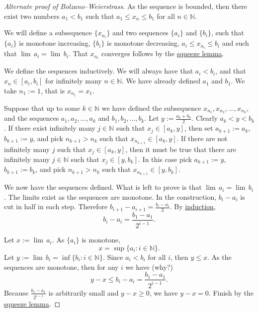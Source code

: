 \documentclass[12pt]{book}
\newcommand{\N}{{\mathbb{N}}}
\theoremstyle{plain}
\theoremstyle{remark}
\theoremstyle{definition}
\theoremstyle{exercise}
\theoremstyle{example}
\begin{document}
\begin{proof}[Alternate proof of Bolzano--Weierstrass]
As the sequence is bounded, then there exist two numbers $a_1 < b_1$
such that $a_1 \leq x_n \leq b_1$ for all $n \in \N$.

We will define a subsequence $\{ x_{n_i} \}$ and two
sequences $\{ a_i \}$ and $\{ b_i \}$, such that
$\{ a_i \}$ is monotone increasing, $\{ b_i \}$ is monotone decreasing,
$a_i \leq x_{n_i} \leq b_i$ and such that $\lim\, a_i = \lim\, b_i$.   That
$x_{n_i}$ converges follows by the \hyperref[squeeze:lemma]{squeeze lemma}.

We define the sequences inductively.  We will always have that $a_i < b_i$,
and that $x_n \in [a_i,b_i]$ for infinitely many
$n \in \N$.
We have already defined $a_1$ and $b_1$.  We take $n_1 := 1$, that is
$x_{n_1} = x_1$.

Suppose that up to some $k \in \N$
we have defined the subsequence $x_{n_1}, x_{n_2}, \ldots,
x_{n_k}$, and the sequences $a_1,a_2,\ldots,a_k$
and $b_1,b_2,\ldots,b_k$.
Let $y := \frac{a_k+b_k}{2}$.
Clearly
$a_k < y < b_k$.  If there exist infinitely many $j \in \N$
such that $x_j \in [a_k,y]$, then set $a_{k+1} := a_k$, $b_{k+1} := y$,
and pick $n_{k+1} > n_{k}$
such that $x_{n_{k+1}} \in [a_k,y]$.  If there are not infinitely many 
$j$ such that 
$x_j \in [a_k,y]$, then it must be true that there are infinitely many $j \in
\N$ such that 
$x_j \in [y,b_k]$.  In this case pick $a_{k+1} := y$, $b_{k+1} := b_k$,
and pick $n_{k+1} > n_{k}$
such that $x_{n_{k+1}} \in [y,b_k]$.

We now have the sequences defined.  What is left to prove is that
$\lim\, a_i = \lim\, b_i$.  The limits exist as the sequences
are monotone.  In the construction,
$b_i - a_i$ is cut in half in each step.  Therefore
$b_{i+1} - a_{i+1} = \frac{b_i-a_i}{2}$.  By
\hyperref[induction:thm]{induction},
\begin{equation*}
b_i - a_i = \frac{b_1-a_1}{2^{i-1}} .
\end{equation*}

Let $x := \lim\, a_i$.  As $\{ a_i \}$ is monotone,
\begin{equation*}
x = \sup \{ a_i : i \in \N \} .
\end{equation*}
Let $y := \lim\, b_i = \inf \{ b_i : i \in \N \}$.  Since $a_i < b_i$ for
all $i$, then $y \leq x$.
As the sequences are monotone, then
for any $i$ we have (why?)
\begin{equation*}
y-x \leq b_i-a_i = \frac{b_1-a_1}{2^{i-1}} .
\end{equation*}
Because $\frac{b_1-a_1}{2^{i-1}}$ is arbitrarily small and $y-x \geq 0$,
we have $y-x = 0$.  Finish by the \hyperref[squeeze:lemma]{squeeze lemma}.
\end{proof}
\end{document}
